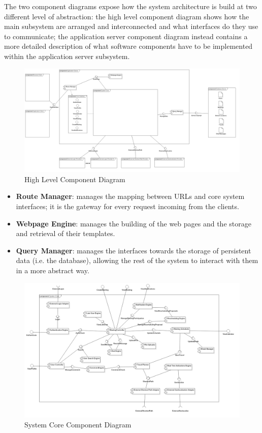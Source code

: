 The two component diagrams expose how the system architecture is build at two different level of abstraction: the high level component diagram shows how the main subsystem are arranged and interconnected and what interfaces do they use to communicate; the application server component diagram instead contains a more detailed description of what software components have to be implemented within the application server subsystem.

\begin{figure}[h]
\centering\includegraphics[width=\textwidth]{Images/UMLDiagrams/HighLevelComponentDiagram.png}
\caption{High Level Component Diagram}
\end{figure}

\begin{itemize}
\item \textbf{Route Manager}: manages the mapping between URLs and core system interfaces; it is the gateway for every request incoming from the clients.
\item \textbf{Webpage Engine}: manages the building of the web pages and the storage and retrieval of their templates.
\item \textbf{Query Manager}: manages the interfaces towards the storage of persistent data (i.e. the database), allowing the rest of the system to interact with them in a more abstract way.
\end{itemize}

\begin{figure}[h]
\centering\includegraphics[width=\textwidth]{Images/UMLDiagrams/ApplicationComponentDiagram.png}
\caption{System Core Component Diagram}
\end{figure}

